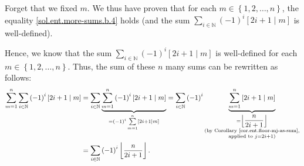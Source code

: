 \documentclass[paper=a4, fontsize=12pt]{scrartcl}%
\let\sumnonlimits\sum
\renewcommand{\sum}{\sumnonlimits\limits}
\theoremstyle{plainsl}
\theoremstyle{definition}
\theoremstyle{remark}
\begin{document}
Forget that we fixed $m$. We thus have proven that for each $m\in\left\{
1,2,\ldots,n\right\}  $, the equality \eqref{sol.ent.more-sums.b.4} holds (and
the sum $\sum_{i\in\mathbb{N}}\left(  -1\right)  ^{i}\left[  2i+1\mid
m\right]  $ is well-defined).

Hence, we know that the sum $\sum_{i\in\mathbb{N}}\left(  -1\right)
^{i}\left[  2i+1\mid m\right]  $ is well-defined for each $m\in\left\{
1,2,\ldots,n\right\}  $. Thus, the sum of these $n$ many sums can be rewritten
as follows:%
\begin{align}
\sum_{m=1}^{n}\sum_{i\in\mathbb{N}}\left(  -1\right)  ^{i}\left[  2i+1\mid
m\right]   &  =\sum_{i\in\mathbb{N}}\underbrace{\sum_{m=1}^{n}\left(
-1\right)  ^{i}\left[  2i+1\mid m\right]  }_{=\left(  -1\right)  ^{i}%
\sum_{m=1}^{n}\left[  2i+1\mid m\right]  }=\sum_{i\in\mathbb{N}}\left(
-1\right)  ^{i}\underbrace{\sum_{m=1}^{n}\left[  2i+1\mid m\right]
}_{\substack{=\left\lfloor \dfrac{n}{2i+1}\right\rfloor \\\text{(by Corollary
\ref{cor.ent.floor-mj-as-sum},}\\\text{applied to }j=2i+1\text{)}}}\nonumber\\
&  =\sum_{i\in\mathbb{N}}\left(  -1\right)  ^{i}\left\lfloor \dfrac{n}%
{2i+1}\right\rfloor . \label{sol.ent.more-sums.b.sumswap}%
\end{align}
\end{document}
